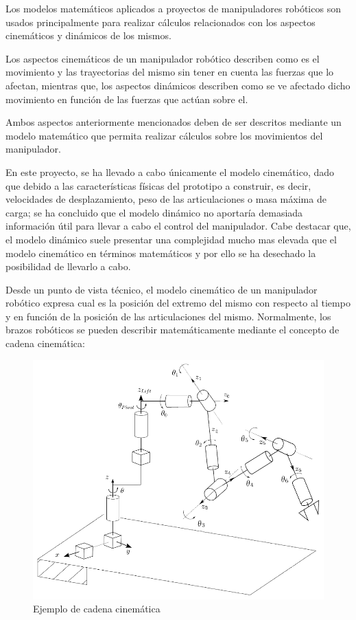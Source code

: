 Los modelos matemáticos aplicados a proyectos de manipuladores robóticos son usados principalmente para realizar cálculos relacionados con los aspectos cinemáticos y dinámicos de los mismos.

Los aspectos cinemáticos de un manipulador robótico describen como es el movimiento y las trayectorias del mismo sin tener en cuenta las fuerzas que lo afectan, mientras que, los aspectos dinámicos describen como se ve afectado dicho movimiento en función de las fuerzas que actúan sobre el.

Ambos aspectos anteriormente mencionados deben de ser descritos mediante un modelo matemático que permita realizar cálculos sobre los movimientos del manipulador. 

En este proyecto, se ha llevado a cabo únicamente el modelo cinemático, dado que debido a las características físicas del prototipo a construir, es decir, velocidades de desplazamiento, peso de las articulaciones o masa máxima de carga; se ha concluido que el modelo dinámico no aportaría demasiada información útil para llevar a cabo el control del manipulador. Cabe destacar que, el modelo dinámico suele presentar una complejidad mucho mas elevada que el modelo cinemático en términos matemáticos y por ello se ha desechado la posibilidad de llevarlo a cabo.

Desde un punto de vista técnico, el modelo cinemático de un manipulador robótico expresa cual es la posición del extremo del mismo con respecto al tiempo y en función de la posición de las articulaciones del mismo. Normalmente, los brazos robóticos se pueden describir matemáticamente mediante el concepto de cadena cinemática:

\begin{figure}[ht!]
    \centering 
    \includegraphics[width=.6\linewidth]{pictures/kinematic chain.png}
    \caption{Ejemplo de cadena cinemática}
    \label{fig:}
\end{figure}

